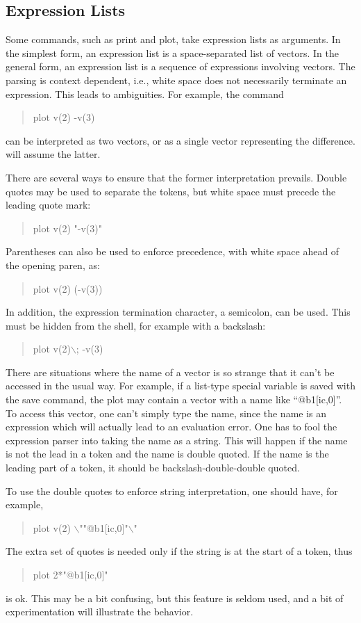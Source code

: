 \subsection{Expression Lists}


Some commands, such as {\cb print} and {\cb plot}, take expression
lists as arguments.  In the simplest form, an expression list is a
space-separated list of vectors.  In the general form, an expression
list is a sequence of expressions involving vectors.  The parsing is
context dependent, i.e., white space does not necessarily terminate an
expression.  This leads to ambiguities.  For example, the command
\begin{quote}
{\vt plot v(2) -v(3)}
\end{quote}
can be interpreted as two vectors, or as a single vector representing
the difference.  {\WRspice} will assume the latter.

There are several ways to ensure that the former interpretation prevails.
Double quotes may be used to separate the tokens, but white space must
precede the leading quote mark:
\begin{quote}
\vt plot v(2) "-v(3)"
\end{quote}
Parentheses can also be used to enforce precedence, with white space
ahead of the opening paren, as:
\begin{quote}
\vt plot v(2) (-v(3))
\end{quote}
In addition, the expression termination character, a semicolon,
can be used.  This must be hidden from the shell, for example
with a backslash:
\begin{quote}
\vt plot v(2)$\backslash$; -v(3)
\end{quote}

There are situations where the name of a vector is so strange that it
can't be accessed in the usual way.  For example, if a list-type
special variable is saved with the {\cb save} command, the plot may
contain a vector with a name like ``{\vt @b1[ic,0]}''.  To access
this vector, one can't simply type the name, since the name is an
expression which will actually lead to an evaluation error.  One has
to fool the expression parser into taking the name as a string.  This
will happen if the name is not the lead in a token and the name is
double quoted.  If the name is the leading part of a token, it should
be backslash-double-double quoted.

To use the double quotes to enforce string interpretation, one should
have, for example,
\begin{quote}
{\vt plot v(2) $\backslash$""@b1[ic,0]"$\backslash$"}
\end{quote}
The extra set of quotes is needed only if the string is at the start
of a token, thus
\begin{quote}
{\vt plot 2*"@b1[ic,0]"}
\end{quote}
is ok.  This may be a bit confusing, but this feature is seldom
used, and a bit of experimentation will illustrate the behavior.


